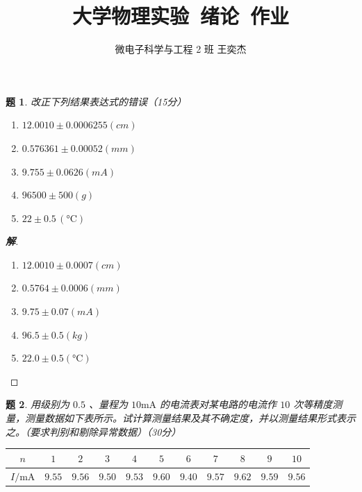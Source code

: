 \documentclass{article}
\title{大学物理实验\ 绪论\ 作业}
\author{微电子科学与工程 2 班 \quad 王奕杰}
\newtheorem{problem}{题}
\newenvironment{solution}
{\begin{proof}[\textbf{解}]\renewcommand{\qedsymbol}{}}
{\end{proof}}
\begin{document}
\maketitle


\noindent
\begin{minipage}[t]{0.48\textwidth}
\begin{problem}
改正下列结果表达式的错误（15分）
\begin{enumerate}[label=(\arabic*)]
    \item $12.0010 \pm 0.0006255 (\unit{cm})$
    \item $0.576361 \pm 0.00052 (\unit{mm})$
    \item $9.755 \pm 0.0626 (\unit{mA})$
    \item $96500 \pm 500 (\unit{g})$
    \item $22 \pm 0.5 \, (\unit{\celsius})$
\end{enumerate}
\end{problem}
\end{minipage}
\hfill
\hfill
\begin{minipage}[t]{0.48\textwidth}
\begin{solution}
\leavevmode
\begin{enumerate}[label=(\arabic*)]
    \item $12.0010 \pm 0.0007 (\unit{cm})$
    \item $0.5764 \pm 0.0006 (\unit{mm})$
    \item $9.75 \pm 0.07 (\unit{mA})$
    \item $96.5 \pm 0.5 (\unit{kg})$
    \item $22.0 \pm 0.5 (\unit{\celsius})$
\end{enumerate}
\end{solution}
\end{minipage}


\begin{problem}
用级别为 $0.5$ 、量程为 $10\mathrm{mA}$ 的电流表对某电路的电流作 $10$ 次等精度测量，测量数据如下表所示。试计算测量结果及其不确定度，并以测量结果形式表示之。（要求判别和剔除异常数据）（30分）
\end{problem}

\begin{table}[h]
\centering
\begin{tabular}{ccccccccccc}
\toprule
$n$ & $1$ & $2$ & $3$ & $4$ & $5$ & $6$ & $7$ & $8$ & $9$ & $10$ \\ \midrule
$I/\text{mA}$ & $9.55$ & $9.56$ & $9.50$ & $9.53$ & $9.60$ & $9.40$ & $9.57$ & $9.62$ & $9.59$ & $9.56$ \\ \bottomrule
\end{tabular}
\end{table}
\end{document}
